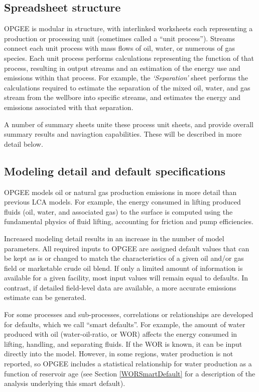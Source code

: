 \documentclass[11pt]{report}
\newcommand{\sheet}[1]{\textit{`{#1}'}}
\begin{document}
\subsection{Spreadsheet structure}

OPGEE is modular in structure, with interlinked worksheets each representing a production or processing unit (sometimes called a ``unit process''). Streams connect each unit process with mass flows of oil, water, or numerous of gas species. Each unit process performs calculations representing the function of that process, resulting in output streams and an estimation of the energy use and emissions within that process. For example, the \sheet{Separation} sheet performs the calculations required to estimate the separation of the mixed oil, water, and gas stream from the wellbore into specific streams, and estimates the energy and emissions associated with that separation.

A number of summary sheets unite these process unit sheets, and provide overall summary results and naviagtion capabilities. These will be described in more detail below.

\subsection{Modeling detail and default specifications}

OPGEE models oil or natural gas production emissions in more detail than previous LCA models. For example, the energy consumed in lifting produced fluids (oil, water, and associated gas) to the surface is computed using the fundamental physics of fluid lifting, accounting for friction and pump efficiencies. 

Increased modeling detail results in an increase in the number of model parameters. All required inputs to OPGEE are assigned default values that can be kept as is or changed to match the characteristics of a given oil and/or gas field or marketable crude oil blend. If only a limited amount of information is available for a given facility, most input values will remain equal to defaults. In contrast, if detailed field-level data are available, a more accurate emissions estimate can be generated.

For some processes and sub-processes, correlations or relationships are developed for defaults, which we call ``smart defaults''. For example, the amount of water produced with oil (water-oil-ratio, or WOR) affects the energy consumed in lifting, handling, and separating fluids. If the WOR is known, it can be input directly into the model. However, in some regions, water production is not reported, so OPGEE includes a statistical relationship for water production as a function of reservoir age (see Section \ref{WORSmartDefault} for a description of the analysis underlying this smart default).
\end{document}

